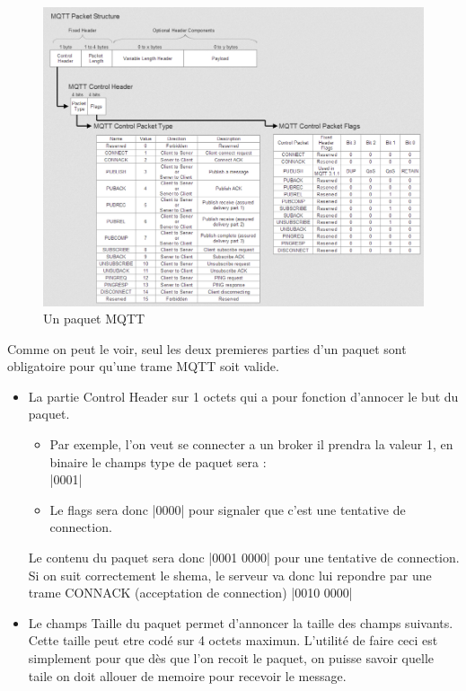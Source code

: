 \documentclass[a4paper,10pt]{article}
\begin{document}
\begin{figure}[h!]
\centering
\includegraphics[scale=0.350]{paquet.jpg}
\caption{Un paquet MQTT}
\label{fig:paquet}
\end{figure}
Comme on peut le voir, seul les deux premieres parties d'un paquet sont obligatoire pour qu'une trame MQTT soit valide.
\begin{itemize}
 \item La partie Control Header sur 1 octets qui a pour fonction d'annocer le but du paquet.\\
 \begin{itemize}
            \item Par exemple, l'on veut se connecter a un broker il  prendra la valeur 1, en binaire le champs type de paquet  sera :\\
                    |0001|
            \item Le flags sera donc |0000| pour signaler que c'est une tentative de connection.
 \end{itemize}
Le contenu du paquet sera donc |0001 0000| pour une tentative de connection.
Si on suit correctement le shema, le serveur va donc lui repondre par une trame CONNACK (acceptation de connection) |0010 0000|

\item Le champs Taille du paquet permet d'annoncer la taille des champs suivants. Cette taille peut etre codé sur 4 octets maximun. L'utilité de faire ceci est simplement pour que dès que l'on recoit le paquet, on puisse savoir quelle taile on doit allouer de memoire pour recevoir le message.
\end{itemize}
\end{document}
